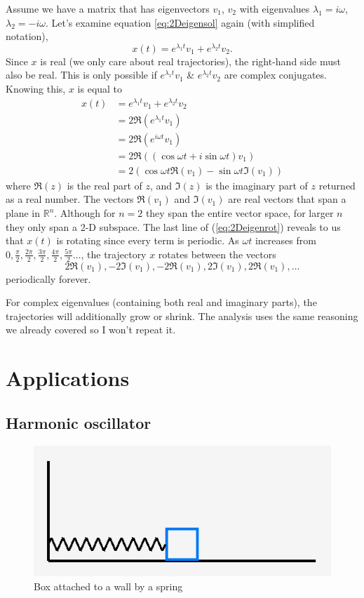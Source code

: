 \documentclass[11pt, oneside]{article}   	%
\begin{document}
Assume we have a matrix that has eigenvectors $v_1$, $v_2$ with eigenvalues $\lambda_1 = i \omega$, $\lambda_2 = -i \omega$.
Let's examine equation \ref*{eq:2Deigensol} again (with simplified notation),
\begin{equation} \nonumber
x(t) = e^{\lambda_1 t}v_1 + e^{\lambda_2 t}v_2.
\end{equation}
Since $x$ is real (we only care about real trajectories), the right-hand side must also be real.
This is only possible if $e^{\lambda_1 t}v_{1}$ \& $e^{\lambda_2 t}v_{2}$ are complex conjugates.
Knowing this, $x$ is equal to
\begin{equation} \label{eq:2Deigenrot}
\begin{aligned}
x(t) & = e^{\lambda_1 t}v_1 + e^{\lambda_2 t}v_2 \\
     & = 2 \Re(e^{\lambda_1 t}v_1) \\
     & = 2 \Re(e^{i\omega t}v_1) \\
     & = 2 \Re((\cos \omega t + i \sin \omega t) v_1) \\
     & = 2 (\cos \omega t \Re(v_1) - \sin \omega t \Im(v_1))
\end{aligned}
\end{equation}
where $\Re(z)$ is the real part of $z$, and $\Im(z)$ is the imaginary part of $z$ returned as a real number.
The vectors $\Re(v_1)$ and $\Im(v_1)$ are real vectors that span a plane in $\mathbb{R}^n$.
Although for $n = 2$ they span the entire vector space, for larger $n$ they only span a 2-D subspace.
The last line of (\ref*{eq:2Deigenrot}) reveals to us that $x(t)$ is rotating since every term is periodic.
As $\omega t$ increases from $0,\frac{\pi}{2},\frac{2\pi}{2},\frac{3\pi}{2},\frac{4\pi}{2},\frac{5\pi}{2}\dots$,
the trajectory $x$ rotates between the vectors
$$2\Re(v_1),-2\Im(v_1),-2\Re(v_1),2\Im(v_1),2\Re(v_1),\dots$$
periodically forever.

For complex eigenvalues (containing both real and imaginary parts), the trajectories will additionally grow or shrink.
The analysis uses the same reasoning we already covered so I won't repeat it.


\section{Applications}
\subsection*{Harmonic oscillator}

\begin{figure}[h]
\centering
\includegraphics[scale=0.5]{boxspring}
\caption{Box attached to a wall by a spring}
\label{fig:BoxSpring}
\end{figure}
\end{document}
